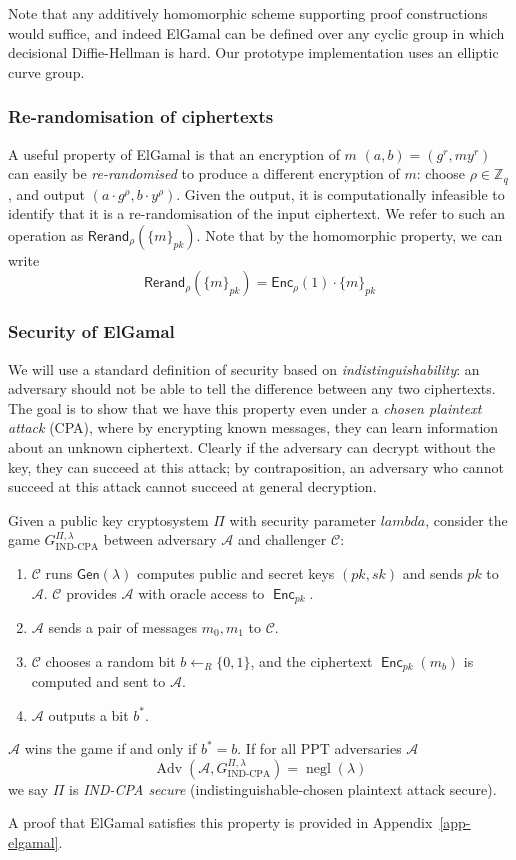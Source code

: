 \documentclass[12pt,a4paper]{article}
\DeclareMathOperator{\negl}{\text{negl}}
\DeclareMathOperator{\Adv}{\text{Adv}}
\DeclareMathOperator{\Enc}{\mathsf{Enc}}
\theoremstyle{definition}
\begin{document}
Note that any additively homomorphic scheme supporting proof constructions would suffice, and indeed ElGamal can be defined over any cyclic group in which decisional Diffie-Hellman is hard. Our prototype implementation uses an elliptic curve group.

\subsubsection{Re-randomisation of ciphertexts}
A useful property of ElGamal is that an encryption of $m$ $(a, b)=(g^r, my^r)$ can easily be \textit{re-randomised} to produce a different encryption of $m$: choose $\rho\in\mathbb{Z}_q$, and output $(a\cdot g^\rho, b\cdot y^\rho)$. Given the output, it is computationally infeasible to identify that it is a re-randomisation of the input ciphertext. We refer to such an operation as $\mathsf{Rerand}_\rho(\{m\}_{pk})$. Note that by the homomorphic property, we can write
$$\mathsf{Rerand}_\rho(\{m\}_{pk})=\mathsf{Enc}_{\rho}(1)\cdot\{m\}_{pk}$$

\subsubsection{Security of ElGamal}
We will use a standard definition of security based on \textit{indistinguishability}: an adversary should not be able to tell the difference between any two ciphertexts. The goal is to show that we have this property even under a \textit{chosen plaintext attack} (CPA), where by encrypting known messages, they can learn information about an unknown ciphertext. Clearly if the adversary can decrypt without the key, they can succeed at this attack; by contraposition, an adversary who cannot succeed at this attack cannot succeed at general decryption.

\begin{definition}
    Given a public key cryptosystem $\Pi$ with security parameter $lambda$, consider the game $G_{\text{IND-CPA}}^{\Pi,\lambda}$ between adversary $\mathcal{A}$ and challenger $\mathcal{C}$:
    \begin{enumerate}
        \item $\mathcal{C}$ runs $\mathsf{Gen}(\lambda)$ computes public and secret keys $(pk, sk)$ and sends $pk$ to $\mathcal{A}$. $\mathcal{C}$ provides $\mathcal{A}$ with oracle access to $\Enc_{pk}$.
        \item $\mathcal{A}$ sends a pair of messages $m_0, m_1$ to $\mathcal{C}$.
        \item $\mathcal{C}$ chooses a random bit $b\gets_R\{0, 1\}$, and the ciphertext $\Enc_{pk}(m_b)$ is computed and sent to $\mathcal{A}$.
        \item $\mathcal{A}$ outputs a bit $b^*$.
    \end{enumerate}
    $\mathcal{A}$ wins  the game if and only if $b^*=b$. If for all PPT adversaries $\mathcal{A}$
    $$\Adv\left(\mathcal{A},G^{\Pi,\lambda}_{\text{IND-CPA}}\right)=\negl(\lambda)$$
    we say $\Pi$ is \textit{IND-CPA secure} (indistinguishable-chosen plaintext attack secure).
\end{definition}
A proof that ElGamal satisfies this property is provided in Appendix~\ref{app-elgamal}.
\end{document}
